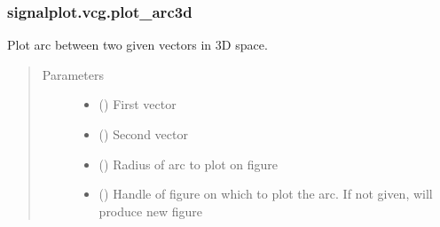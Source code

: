 \documentclass[letterpaper,10pt,english]{sphinxmanual}
\begin{document}
\subsubsection{signalplot.vcg.plot\_arc3d}
\label{\detokenize{_autosummary/signalplot.vcg.plot_arc3d:signalplot-vcg-plot-arc3d}}\label{\detokenize{_autosummary/signalplot.vcg.plot_arc3d::doc}}

\begin{fulllineitems}
\label{\detokenize{_autosummary/signalplot.vcg.plot_arc3d:signalplot.vcg.plot_arc3d}}
\sphinxAtStartPar
Plot arc between two given vectors in 3D space.
\begin{quote}\begin{description}
\item[{Parameters}] \leavevmode\begin{itemize}
\item {} 
\sphinxAtStartPar
{} () \textendash{} First vector

\item {} 
\sphinxAtStartPar
{} () \textendash{} Second vector

\item {} 
\sphinxAtStartPar
{} (\sphinxstyleliteralemphasis{\sphinxupquote{, }}) \textendash{} Radius of arc to plot on figure

\item {} 
\sphinxAtStartPar
{} (\sphinxstyleliteralemphasis{\sphinxupquote{, }}) \textendash{} Handle of figure on which to plot the arc. If not given, will produce new figure


\end{itemize}
\end{description}
\end{quote}
\end{fulllineitems}
\end{document}
